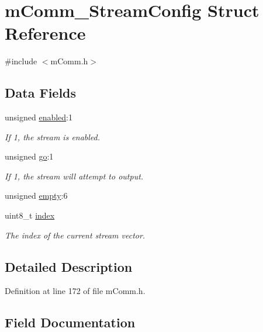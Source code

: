 \hypertarget{structm_comm___stream_config}{}\section{m\+Comm\+\_\+\+Stream\+Config Struct Reference}
\label{structm_comm___stream_config}


{\ttfamily \#include $<$m\+Comm.\+h$>$}

\subsection*{Data Fields}
\begin{DoxyCompactItemize}
\item 
unsigned \hyperlink{structm_comm___stream_config_a50101089d91b712b53825d25ab0a5a2a}{enabled}\+:1
\begin{DoxyCompactList}\small\item\em If \textquotesingle{}1\textquotesingle{}, the stream is enabled. \end{DoxyCompactList}\item 
unsigned \hyperlink{structm_comm___stream_config_a3444acdcb503f16a81374dd25b4d894e}{go}\+:1
\begin{DoxyCompactList}\small\item\em If \textquotesingle{}1\textquotesingle{}, the stream will attempt to output. \end{DoxyCompactList}\item 
unsigned \hyperlink{structm_comm___stream_config_ae37c23a4ce1b446693db111c22c80f08}{empty}\+:6
\item 
uint8\+\_\+t \hyperlink{structm_comm___stream_config_aae5a12e607d0f782506d9e6ec6179c64}{index}
\begin{DoxyCompactList}\small\item\em The index of the current stream vector. \end{DoxyCompactList}\end{DoxyCompactItemize}


\subsection{Detailed Description}


Definition at line 172 of file m\+Comm.\+h.



\subsection{Field Documentation}
\hypertarget{structm_comm___stream_config_ae37c23a4ce1b446693db111c22c80f08}{}
